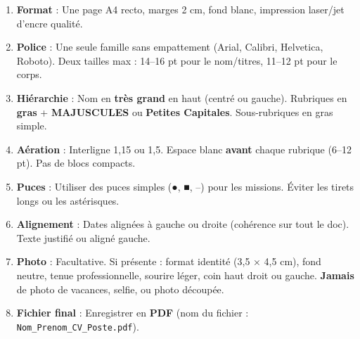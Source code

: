 \documentclass[11pt]{article}
\begin{document}
\begin{methode}
\begin{enumerate}
\item \textbf{Format} : Une page A4 recto, marges 2 cm, fond blanc, impression laser/jet d'encre qualité.
\item \textbf{Police} : Une seule famille sans empattement (Arial, Calibri, Helvetica, Roboto). Deux tailles max : 14--16 pt pour le nom/titres, 11--12 pt pour le corps.
\item \textbf{Hiérarchie} : Nom en \textbf{très grand} en haut (centré ou gauche). Rubriques en \textbf{gras} + \textbf{MAJUSCULES} ou \textbf{Petites Capitales}. Sous-rubriques en gras simple.
\item \textbf{Aération} : Interligne 1,15 ou 1,5. Espace blanc \textbf{avant} chaque rubrique (6--12 pt). Pas de blocs compacts.
\item \textbf{Puces} : Utiliser des puces simples (●, ■, –) pour les missions. Éviter les tirets longs ou les astérisques.
\item \textbf{Alignement} : Dates alignées à gauche ou droite (cohérence sur tout le doc). Texte justifié ou aligné gauche.
\item \textbf{Photo} : Facultative. Si présente : format identité (3,5 × 4,5 cm), fond neutre, tenue professionnelle, sourire léger, coin haut droit ou gauche. \textbf{Jamais} de photo de vacances, selfie, ou photo découpée.
\item \textbf{Fichier final} : Enregistrer en \textbf{PDF} (nom du fichier : \texttt{Nom\_Prenom\_CV\_Poste.pdf}).
\end{enumerate}
\end{methode}
\end{document}
